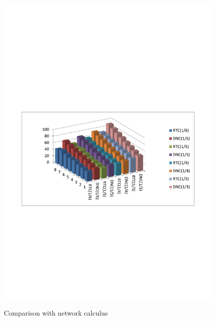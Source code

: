 \documentclass[preprint]{elsarticle}
\begin{document}
\begin{figure}
  \centering
  \includegraphics[scale=0.7]{figures/rtcvsdnc.pdf}\\
  \caption{Comparison with network calculus}\label{comparison}
\end{figure}
\end{document}
